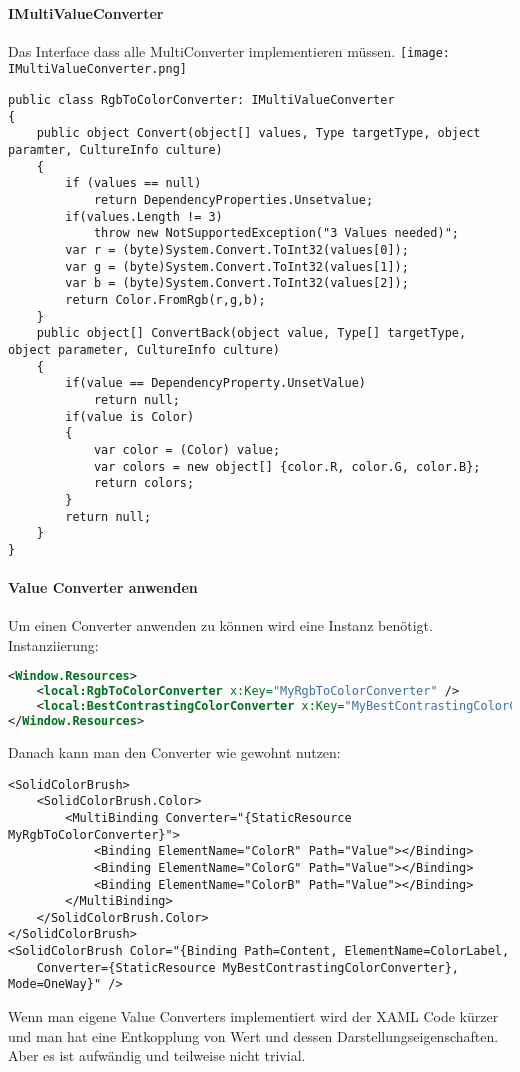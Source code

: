 \paragraph{IMultiValueConverter} Das Interface dass alle MultiConverter implementieren müssen.
\texttt{[image: IMultiValueConverter.png]}
\begin{lstlisting}
public class RgbToColorConverter: IMultiValueConverter
{
    public object Convert(object[] values, Type targetType, object paramter, CultureInfo culture)
    {
        if (values == null)
            return DependencyProperties.Unsetvalue;
        if(values.Length != 3)
            throw new NotSupportedException("3 Values needed)";
        var r = (byte)System.Convert.ToInt32(values[0]);
        var g = (byte)System.Convert.ToInt32(values[1]);
        var b = (byte)System.Convert.ToInt32(values[2]);
        return Color.FromRgb(r,g,b);
    }
    public object[] ConvertBack(object value, Type[] targetType, object parameter, CultureInfo culture)
    {
        if(value == DependencyProperty.UnsetValue)
            return null;
        if(value is Color)
        {
            var color = (Color) value;
            var colors = new object[] {color.R, color.G, color.B};
            return colors;
        }
        return null;
    }
}
\end{lstlisting}
\paragraph{Value Converter anwenden} Um einen Converter anwenden zu können wird eine Instanz benötigt. Instanziierung:
\begin{lstlisting}[language=xml, caption="Instanzieren"]
<Window.Resources>
    <local:RgbToColorConverter x:Key="MyRgbToColorConverter" />
    <local:BestContrastingColorConverter x:Key="MyBestContrastingColorConverter" />
</Window.Resources>
\end{lstlisting}
Danach kann man den Converter wie gewohnt nutzen:
\begin{lstlisting}
<SolidColorBrush>
    <SolidColorBrush.Color>
        <MultiBinding Converter="{StaticResource MyRgbToColorConverter}">
            <Binding ElementName="ColorR" Path="Value"></Binding>
            <Binding ElementName="ColorG" Path="Value"></Binding>
            <Binding ElementName="ColorB" Path="Value"></Binding>
        </MultiBinding>
    </SolidColorBrush.Color>
</SolidColorBrush>
<SolidColorBrush Color="{Binding Path=Content, ElementName=ColorLabel,
    Converter={StaticResource MyBestContrastingColorConverter}, Mode=OneWay}" />
\end{lstlisting}
Wenn man eigene Value Converters implementiert wird der XAML Code kürzer und man hat eine Entkopplung von Wert und dessen Darstellungseigenschaften. Aber es ist aufwändig und teilweise nicht trivial.
